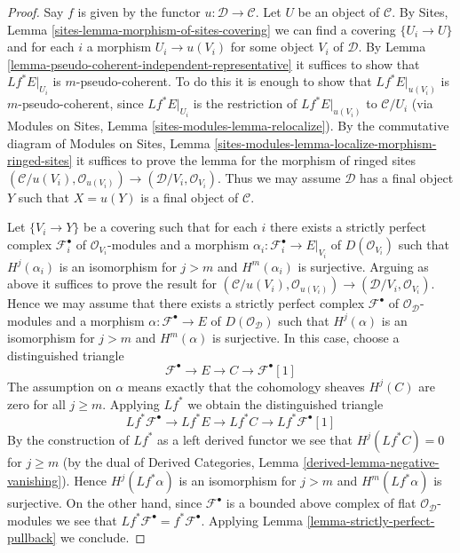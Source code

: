 \begin{proof}
Say $f$ is given by the functor $u : \mathcal{D} \to \mathcal{C}$.
Let $U$ be an object of $\mathcal{C}$. By
Sites, Lemma \ref{sites-lemma-morphism-of-sites-covering}
we can find a covering $\{U_i \to U\}$ and for each $i$ a morphism
$U_i \to u(V_i)$ for some object $V_i$ of $\mathcal{D}$.
By Lemma \ref{lemma-pseudo-coherent-independent-representative}
it suffices to show that $Lf^*E|_{U_i}$ is $m$-pseudo-coherent.
To do this it is enough to show that $Lf^*E|_{u(V_i)}$ is
$m$-pseudo-coherent, since $Lf^*E|_{U_i}$ is the restriction
of $Lf^*E|_{u(V_i)}$ to $\mathcal{C}/U_i$ (via
Modules on Sites, Lemma
\ref{sites-modules-lemma-relocalize}).
By the commutative diagram of
Modules on Sites, Lemma
\ref{sites-modules-lemma-localize-morphism-ringed-sites}
it suffices to prove the lemma for the morphism of ringed
sites $(\mathcal{C}/u(V_i), \mathcal{O}_{u(V_i)}) \to
(\mathcal{D}/V_i, \mathcal{O}_{V_i})$.
Thus we may assume $\mathcal{D}$ has a final object $Y$ such that
$X = u(Y)$ is a final object of $\mathcal{C}$.

\medskip\noindent
Let $\{V_i \to Y\}$ be a covering such that for each $i$ there exists
a strictly perfect complex $\mathcal{F}_i^\bullet$ of
$\mathcal{O}_{V_i}$-modules and a morphism
$\alpha_i : \mathcal{F}_i^\bullet \to E|_{V_i}$ of $D(\mathcal{O}_{V_i})$
such that $H^j(\alpha_i)$ is an isomorphism
for $j > m$ and $H^m(\alpha_i)$ is surjective.
Arguing as above it suffices to prove the result for
$(\mathcal{C}/u(V_i), \mathcal{O}_{u(V_i)}) \to
(\mathcal{D}/V_i, \mathcal{O}_{V_i})$. Hence we may assume that
there exists a strictly perfect complex $\mathcal{F}^\bullet$ of
$\mathcal{O}_\mathcal{D}$-modules and a morphism
$\alpha : \mathcal{F}^\bullet \to E$ of $D(\mathcal{O}_\mathcal{D})$
such that $H^j(\alpha)$ is an isomorphism
for $j > m$ and $H^m(\alpha)$ is surjective. In this case, choose
a distinguished triangle
$$
\mathcal{F}^\bullet \to E \to C \to \mathcal{F}^\bullet[1]
$$
The assumption on $\alpha$ means exactly that the cohomology sheaves
$H^j(C)$ are zero for all $j \geq m$. Applying $Lf^*$ we obtain
the distinguished triangle
$$
Lf^*\mathcal{F}^\bullet \to Lf^*E \to Lf^*C \to Lf^*\mathcal{F}^\bullet[1]
$$
By the construction of $Lf^*$ as a left derived functor we see that
$H^j(Lf^*C) = 0$ for $j \geq m$ (by the dual of Derived Categories, Lemma
\ref{derived-lemma-negative-vanishing}). Hence $H^j(Lf^*\alpha)$ is an
isomorphism for $j > m$ and $H^m(Lf^*\alpha)$ is surjective.
On the other hand, since
$\mathcal{F}^\bullet$ is a bounded above complex of flat
$\mathcal{O}_\mathcal{D}$-modules we see that
$Lf^*\mathcal{F}^\bullet = f^*\mathcal{F}^\bullet$.
Applying Lemma \ref{lemma-strictly-perfect-pullback} we conclude.
\end{proof}

